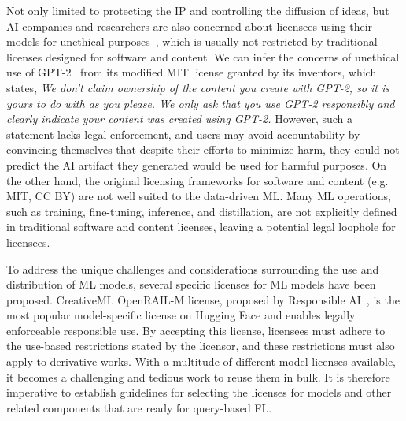 Not only limited to protecting the IP and controlling the diffusion of ideas, but AI companies and researchers are also concerned about licensees using their models for unethical purposes~\cite{jobin2019global, awad2018moral, yuste2017four}, which is usually not restricted by traditional licenses designed for software and content.
We can infer the concerns of unethical use of GPT-2~\cite{radford2019language} from its modified MIT license granted by its inventors, which states, \textit{We don't claim ownership of the content you create with GPT-2, so it is yours to do with as you please. We only ask that you use GPT-2 responsibly and clearly indicate your content was created using GPT-2.} 
However, such a statement lacks legal enforcement, and users may avoid accountability by convincing themselves that despite their efforts to minimize harm, they could not predict the AI artifact they generated would be used for harmful purposes.
On the other hand, the original licensing frameworks for software and content (e.g. MIT, CC BY) are not well suited to the data-driven ML. 
Many ML operations, such as training, fine-tuning, inference, and distillation, are not explicitly defined in traditional software and content licenses, leaving a potential legal loophole for licensees.

To address the unique challenges and considerations surrounding the use and distribution of ML models, several specific licenses for ML models have been proposed. 
CreativeML OpenRAIL-M license, proposed by Responsible AI~\cite{contractor2022behavioral}, is the most popular model-specific license on Hugging Face and enables legally enforceable responsible use.
By accepting this license, licensees must adhere to the use-based restrictions stated by the licensor, and these restrictions must also apply to derivative works.
With a multitude of different model licenses available, it becomes a challenging and tedious work to reuse them in bulk. 
It is therefore imperative to establish guidelines for selecting the licenses for models and other related components that are ready for query-based FL.



